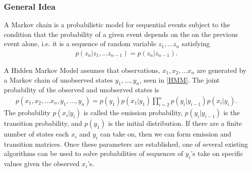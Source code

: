 \documentclass{article}
\numberwithin{equation}{section}
\theoremstyle{definition}
\begin{document}
\subsubsection{General Idea} A Markov chain is a probabilistic model for sequential events subject to the condition that the probability of a given event depends on the on the previous event alone, i.e.  it is a sequence of random variable $z_1,...z_n$ satisfying
\begin{align}
    p(z_n| z_1,\dots z_{n-1}) =  p(z_n| z_{n-1}).
\end{align}



A Hidden Markov Model assumes that observations, $x_1,x_2,\dots x_n$ are generated by a Markov chain of unobserved states $y_1,\dots,y_n$, seen in \ref{HMM}. The joint probability of the observed and unobserved states is
\begin{align*}
    p(x_1,x_2,\dots x_n,y_1,\dots,y_n) = p(y_1)p(x_1|y_1) \prod_{i=2}^n p(y_i|y_{i-1})p(x_i|y_i).
\end{align*}
The probability $p(x_i|y_i)$ is called the emission probability, $p(y_{i}|y_{i-1})$ is the transition probability, and $p(y_1)$ is the initial distribution. If there are a finite number of states each $x_i$ and $y_i$ can take on, then we can form emission and transition matrices. Once these parameters are established, one of several existing algorithms can be used to solve probabilities of sequences of $y_i$'s take on specific values given the observed $x_i$'s. 
\end{document}
